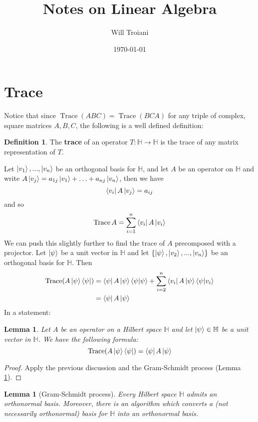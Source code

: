 \documentclass[12pt]{article}
\title{Notes on Linear Algebra}
\author{Will Troiani}
\date{\today}
\theoremstyle{plain}
\newtheorem{lemma}[thm]{Lemma}
\theoremstyle{definition}
\newtheorem{defn}[thm]{Definition} %
\newcommand{\bb}[1]{\mathbb{#1}}
\newcommand{\lto}{\longrightarrow}
\begin{document}
\maketitle

\section{Trace}
Notice that since $\operatorname{Trace}(ABC) = \operatorname{Trace}(BCA)$ for any triple of complex, square matrices $A,B,C$, the following is a well defined definition:
\begin{defn}
The \textbf{trace} of an operator $T: \bb{H} \lto \bb{H}$ is the trace of any matrix representation of $T$.
\end{defn}
Let $\ket{v_1},...,\ket{v_n}$ be an orthogonal basis for $\bb{H}$, and let $A$ be an operator on $\bb{H}$ and write $A\ket{v_j} = a_{1j}\ket{v_1} + \hdots + a_{nj}\ket{v_n}$, then we have
\begin{equation}
\bra{v_i}A\ket{v_j} = a_{ij}
\end{equation}
and so
\begin{equation}
\operatorname{Trace}A = \sum_{i = 1}^n \bra{v_i}A\ket{v_i}
\end{equation}
We can push this slightly further to find the trace of $A$ precomposed with a projector. Let $\ket{\psi}$ be a unit vector in $\bb{H}$ and let $\lbrace \ket{\psi},\ket{v_2},...,\ket{v_n}\rbrace$ be an orthogonal basis for $\bb{H}$. Then
\begin{align*}
\operatorname{Trace}(A\ket{\psi}\bra{\psi}) &= \bra{\psi}A\ket{\psi}\bra{\psi}\ket{\psi} + \sum_{i = 2}^n \bra{v_i}A\ket{\psi}\bra{\psi}\ket{v_i}\\
&= \bra{\psi}A\ket{\psi}
\end{align*}
In a statement:
\begin{lemma}\label{lem:trace_evaluation}
Let $A$ be an operator on a Hilbert space $\bb{H}$ and let $\ket{\psi} \in \bb{H}$ be a unit vector in $\bb{H}$. We have the following formula:
\begin{equation}
\operatorname{Trace}(A\ket{\psi}\bra{\psi}) = \bra{\psi}A\ket{\psi}
\end{equation}
\end{lemma}
\begin{proof}
Apply the previous discussion and the Gram-Schmidt process (Lemma \ref{lem:gram_schmidt}).
\end{proof}
\begin{lemma}[Gram-Schmidt process]\label{lem:gram_schmidt}
Every Hilbert space $\bb{H}$ admits an orthonormal basis. Moreover, there is an algorithm which converts a (not necessarily orthonormal) basis for $\bb{H}$ into an orthonormal basis.
\end{lemma}
\end{document}
